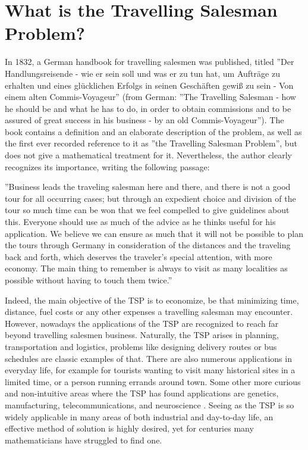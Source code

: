\section{What is the Travelling Salesman Problem?}
\label{IntroTSP}

\par
In 1832, a German handbook for travelling salesmen was published, titled ''Der Handlungsreisende - wie er sein soll und was er zu tun hat, um Auftr{\"a}ge zu erhalten und eines gl{\"u}cklichen Erfolgs in seinen Gesch{\"a}ften gewi{\ss} zu sein - Von einem alten Commis-Voyageur'' (from German: ''The Travelling Salesman - how he should be and what he has to do, in order to obtain commissions and to be assured of great success in his business - by an old Commis-Voyageur'').
The book contains a definition and an elaborate description of the problem, as well as the first ever recorded reference to it as ''the Travelling Salesman Problem'', but does not give a mathematical treatment for it. Nevertheless, the author clearly recognizes its importance, writing the following passage: 

\begin{displayquote} 
	''Business leads the traveling salesman here and there, and there is not a good tour for all occurring cases; but through an expedient choice and division of the tour so much time can be won that we feel compelled to give guidelines about this. Everyone should use as much of the advice as he thinks useful for his application. We believe we can ensure as much that it will not be possible to plan the tours through Germany in consideration of the distances and the traveling back and forth, which deserves the traveler’s special attention, with more economy. The main thing to remember is always to visit as many localities as possible without having to touch them twice.'' \cite{tspbook}
\end{displayquote}

Indeed, the main objective of the TSP is to economize, be that minimizing time, distance, fuel costs or any other expenses a travelling salesman may encounter. However, nowadays the applications of the TSP are recognized to reach far beyond travelling salesmen business. Naturally, the TSP arises in planning, transportation and logistics, problems like designing delivery routes or bus schedules are classic examples of that. There are also numerous applications in everyday life, for example for tourists wanting to visit many historical sites in a limited time, or a person running errands around town. Some other more curious and non-intuitive areas where the TSP has found applications are genetics, manufacturing, telecommunications, and neuroscience \cite{tspbook} \cite{ORlecture}.
Seeing as the TSP is so widely applicable in many areas of both industrial and day-to-day life, an effective method of solution is highly desired, yet for centuries many mathematicians have struggled to find one.

